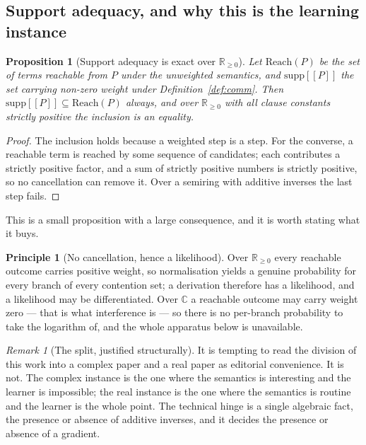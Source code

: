 \documentclass[11pt,a4paper]{article}
\theoremstyle{plain}
\newtheorem{proposition}[theorem]{Proposition}
\theoremstyle{definition}
\newtheorem{principle}[theorem]{Principle}
\theoremstyle{remark}
\newtheorem{remark}[theorem]{Remark}
\newcommand{\sem}[1]{[\![#1]\!]}
\newcommand{\Rnn}{\mathbb{R}_{\geq 0}}
\newcommand{\Cx}{\mathbb{C}}
\newcommand{\Reach}{\mathrm{Reach}}
\newcommand{\supp}{\mathrm{supp}}
\begin{document}
\subsection{Support adequacy, and why this is the learning instance}
\label{ssec:adequacy}

\begin{proposition}[Support adequacy is exact over $\Rnn$]\label{prop:adequacy}
Let $\Reach(P)$ be the set of terms reachable from $P$ under the unweighted
semantics, and $\supp\sem{P}$ the set carrying non-zero weight under
Definition~\ref{def:comm}. Then $\supp\sem{P} \subseteq \Reach(P)$ always, and
over $\Rnn$ with all clause constants strictly positive the inclusion is an
equality.
\end{proposition}

\begin{proof}
The inclusion holds because a weighted step is a step. For the converse, a
reachable term is reached by some sequence of candidates; each contributes a
strictly positive factor, and a sum of strictly positive numbers is strictly
positive, so no cancellation can remove it. Over a semiring with additive
inverses the last step fails.
\end{proof}

This is a small proposition with a large consequence, and it is worth stating
what it buys.

\begin{principle}[No cancellation, hence a likelihood]\label{prin:likelihood}
Over $\Rnn$ every reachable outcome carries positive weight, so normalisation
yields a genuine probability for every branch of every contention set; a
derivation therefore has a likelihood, and a likelihood may be differentiated.
Over $\Cx$ a reachable outcome may carry weight zero --- that is what interference
is --- so there is no per-branch probability to take the logarithm of, and the
whole apparatus below is unavailable.
\end{principle}

\begin{remark}[The split, justified structurally]\label{rem:nocomplex}
It is tempting to read the division of this work into a complex paper and a real
paper as editorial convenience. It is not. The complex instance is the one where
the semantics is interesting and the learner is impossible; the real instance is
the one where the semantics is routine and the learner is the whole point. The
technical hinge is a single algebraic fact, the presence or absence of additive
inverses, and it decides the presence or absence of a gradient.
\end{remark}
\end{document}

